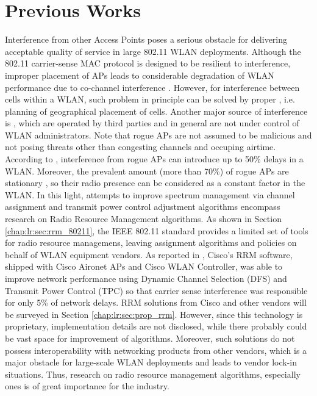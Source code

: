 \section {Previous Works}
\label{chap:lr:sec:prev_works}
Interference from other Access Points poses a serious obstacle \cite{suiHowBadAre2015} for delivering acceptable quality of service in large 802.11 WLAN deployments. Although the 802.11 carrier-sense MAC protocol is designed to be resilient to interference, improper placement of APs leads to considerable degradation of WLAN performance due to co-channel interference \cite{levantiCAPWAPCompliantSolutionRadio2007}. However, for interference between cells within a WLAN, such problem in principle can be solved by proper \cite{site surveying}, i.e. planning of geographical placement of cells. Another major source of interference is , which are operated by third parties and in general are not under control of WLAN administrators. Note that rogue APs are not assumed to be malicious and not posing threats other than congesting channels and occuping airtime. According to \cite{suiHowBadAre2015}, interference from rogue APs can introduce up to 50\% delays in a WLAN. Moreover, the prevalent amount (more than 70\%) of rogue APs are stationary \cite{suiHowBadAre2015}, so their radio presence can be considered as a constant factor in the WLAN.
In this light, attempts to improve spectrum management via channel assignment and transmit power control adjustment algorithms encompass research on Radio Resource Management algorithms. As shown in Section \ref{chap:lr:sec:rrm_80211}, the IEEE 802.11 standard provides a limited set of tools for radio resource managemens, leaving assignment algorithms and policies on behalf of WLAN equipment vendors. As reported in \cite{suiHowBadAre2015}, Cisco's RRM software, shipped with Cisco Aironet APs and Cisco WLAN Controller, was able to improve network performance using Dynamic Channel Selection (DFS) and Transmit Power Control (TPC)  so that carrier sense interference was responsible for only 5\% of network delays. RRM solutions from Cisco and other vendors will be surveyed in Section \ref{chap:lr:sec:prop_rrm}. However, since this technology is proprietary, implementation details are not disclosed, while there probably could be vast space for improvement of algorithms. Moreover, such solutions do not possess interoperability with networking products from other vendors, which is a major obstacle for large-scale WLAN deployments and leads to vendor lock-in situations. Thus, research on radio resource management algorithms, especially ones is of great importance for the industry.

